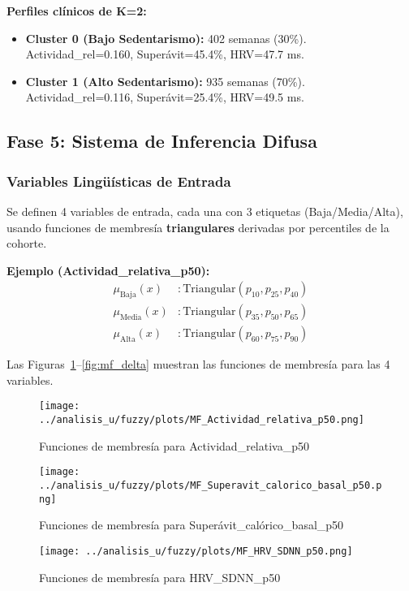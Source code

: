 \documentclass[12pt,a4paper,twoside]{article}
\begin{document}
\textbf{Perfiles clínicos de K=2:}
\begin{itemize}
    \item \textbf{Cluster 0 (Bajo Sedentarismo):} 402 semanas (30\%). Actividad\_rel=0.160, Superávit=45.4\%, HRV=47.7 ms.
    \item \textbf{Cluster 1 (Alto Sedentarismo):} 935 semanas (70\%). Actividad\_rel=0.116, Superávit=25.4\%, HRV=49.5 ms.
\end{itemize}

\subsection{Fase 5: Sistema de Inferencia Difusa}

\subsubsection{Variables Lingüísticas de Entrada}

Se definen 4 variables de entrada, cada una con 3 etiquetas (Baja/Media/Alta), usando funciones de membresía \textbf{triangulares} derivadas por percentiles de la cohorte.

\textbf{Ejemplo (Actividad\_relativa\_p50):}
\begin{align}
\mu_{\text{Baja}}(x) &: \text{Triangular}(p_{10}, p_{25}, p_{40}) \\
\mu_{\text{Media}}(x) &: \text{Triangular}(p_{35}, p_{50}, p_{65}) \\
\mu_{\text{Alta}}(x) &: \text{Triangular}(p_{60}, p_{75}, p_{90})
\end{align}

Las Figuras~\ref{fig:mf_actividad}--\ref{fig:mf_delta} muestran las funciones de membresía para las 4 variables.

\begin{figure}[h]
\centering
\texttt{[image: ../analisis\_u/fuzzy/plots/MF\_Actividad\_relativa\_p50.png]}
\caption{Funciones de membresía para Actividad\_relativa\_p50}
\label{fig:mf_actividad}
\end{figure}

\begin{figure}[h]
\centering
\texttt{[image: ../analisis\_u/fuzzy/plots/MF\_Superavit\_calorico\_basal\_p50.png]}
\caption{Funciones de membresía para Superávit\_calórico\_basal\_p50}
\label{fig:mf_superavit}
\end{figure}

\begin{figure}[h]
\centering
\texttt{[image: ../analisis\_u/fuzzy/plots/MF\_HRV\_SDNN\_p50.png]}
\caption{Funciones de membresía para HRV\_SDNN\_p50}
\label{fig:mf_hrv}
\end{figure}
\end{document}
